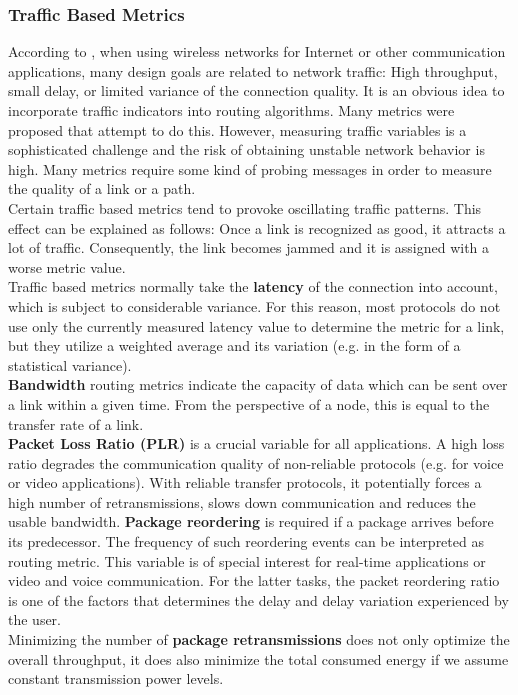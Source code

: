 \subsubsection{Traffic Based Metrics}
According to \cite{SurveyOnRoutingMetrics}, when using wireless networks for Internet or other communication applications, many design goals are related to network traffic: High throughput, small delay, or limited variance of the connection quality. It is an obvious idea to incorporate traffic indicators into routing algorithms. Many metrics were proposed that attempt to do this. However, measuring traffic variables is a sophisticated challenge and the risk of obtaining unstable network behavior is high. Many metrics require some kind of probing messages in order to measure the quality of a link or a path.\\
Certain traffic based metrics tend to provoke oscillating traffic patterns. This effect can be explained as follows: Once a link is recognized as good, it attracts a lot of traffic. Consequently, the link becomes jammed and it is assigned with a worse metric value.\\
Traffic based metrics normally take the \textbf{latency} of the connection into account, which is subject to considerable variance. For this reason, most protocols do not use only the currently measured latency value to determine the metric for a link, but they utilize a weighted average and its variation (e.g. in the form of a statistical variance).\\
\textbf{Bandwidth} routing metrics indicate the capacity of data which can be sent over a link within a given time. From the perspective of a node, this is equal to the transfer rate of a link.\\
\textbf{Packet Loss Ratio (PLR)} is a crucial variable for all applications. A high loss ratio degrades the communication quality of non-reliable protocols (e.g. for voice or video applications). With reliable transfer protocols, it potentially forces a high number of retransmissions, slows down communication and reduces the usable bandwidth.
\textbf{Package reordering} is required if a package arrives before its predecessor. The frequency of such reordering events can be interpreted as routing metric. This variable is of special interest for real-time applications or video and voice communication. For the latter tasks, the packet reordering ratio is one of the factors that determines the delay and delay variation experienced by the user.\\
Minimizing the number of \textbf{package retransmissions} does not only optimize the overall throughput, it does also minimize the total consumed energy if we assume constant transmission power levels.
% 
